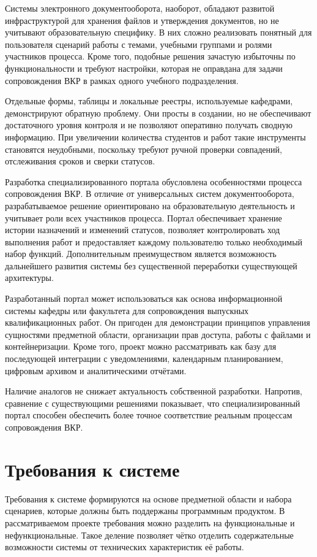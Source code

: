 \documentclass[14pt,a4paper]{extreport}
\begin{document}
Системы электронного документооборота, наоборот, обладают развитой
инфраструктурой для хранения файлов и утверждения документов, но не
учитывают образовательную специфику.
В них сложно реализовать понятный для пользователя сценарий работы с
темами, учебными группами и ролями участников процесса.
Кроме того, подобные решения зачастую избыточны по функциональности и
требуют настройки, которая не оправдана для задачи сопровождения ВКР в
рамках одного учебного подразделения.

Отдельные формы, таблицы и локальные реестры, используемые кафедрами,
демонстрируют обратную проблему.
Они просты в создании, но не обеспечивают достаточного уровня контроля и
не позволяют оперативно получать сводную информацию.
При увеличении количества студентов и работ такие инструменты становятся
неудобными, поскольку требуют ручной проверки совпадений, отслеживания
сроков и сверки статусов.

Разработка специализированного портала обусловлена особенностями процесса
сопровождения ВКР. В отличие от универсальных систем документооборота,
разрабатываемое решение ориентировано на образовательную деятельность и
учитывает роли всех участников процесса. Портал обеспечивает хранение истории
назначений и изменений статусов, позволяет контролировать ход выполнения работ
и предоставляет каждому пользователю только необходимый набор функций.
Дополнительным преимуществом является возможность дальнейшего развития системы
без существенной переработки существующей архитектуры.

Разработанный портал может использоваться как основа информационной системы кафедры или факультета для сопровождения выпускных квалификационных работ.
Он пригоден для демонстрации принципов управления сущностями предметной
области, организации прав доступа, работы с файлами и контейнеризации.
Кроме того, проект можно рассматривать как базу для последующей интеграции
с уведомлениями, календарным планированием, цифровым архивом и
аналитическими отчётами.

Наличие аналогов не снижает актуальность собственной разработки.
Напротив, сравнение с существующими решениями показывает, что
специализированный портал способен обеспечить более точное соответствие
реальным процессам сопровождения ВКР.

\section{Требования к системе}

Требования к системе формируются на основе предметной области и набора
сценариев, которые должны быть поддержаны программным продуктом.
В рассматриваемом проекте требования можно разделить на функциональные и
нефункциональные.
Такое деление позволяет чётко отделить содержательные возможности системы
от технических характеристик её работы.
\end{document}
